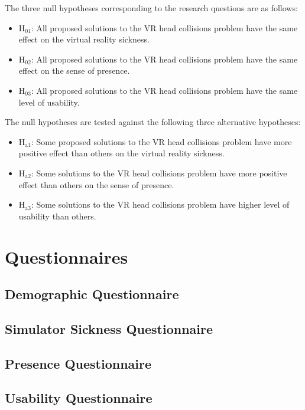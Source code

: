 The three null hypotheses corresponding to the research questions are as follows:

\begin{itemize}
\item H$_{\text{01}}$: All proposed solutions to the VR head collisions problem have the same effect on the virtual reality sickness.
\item H$_{\text{02}}$: All proposed solutions to the VR head collisions problem have the same effect on the sense of presence.
\item H$_{\text{03}}$: All proposed solutions to the VR head collisions problem have the same level of usability.
\end{itemize}

The null hypotheses are tested against the following three alternative hypotheses:

\begin{itemize}
\item H$_{\text{a1}}$: Some proposed solutions to the VR head collisions problem have more positive effect than others on the virtual reality sickness.
\item H$_{\text{a2}}$: Some solutions to the VR head collisions problem have more positive effect than others on the sense of presence.
\item H$_{\text{a3}}$: Some solutions to the VR head collisions problem have higher level of usability than others.
\end{itemize}

\section{Questionnaires}

\subsection{Demographic Questionnaire}

\subsection{Simulator Sickness Questionnaire}

\subsection{Presence Questionnaire}

\subsection{Usability Questionnaire}

